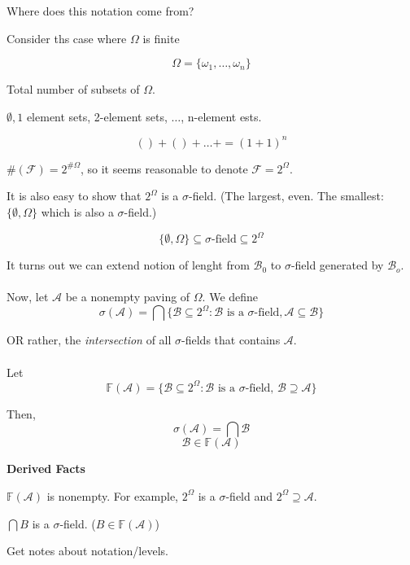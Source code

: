 \documentclass[11pt,fleqn]{book} %
\begin{document}
\begin{remark}
	Where does this notation come from?

Consider ths case where $\Omega$ is finite

$$\Omega = \{\omega_1, \dots, \omega_n \} $$

Total number of subsets of $\Omega$. 

$\emptyset, 1$ element sets, 2-element sets, $\dots$, n-element ests.

$$() + () + \dots + = (1+1)^n$$

$\#(\mathcal{F})  = 2^{\# \Omega}$, so it seems reasonable to denote $\mathcal{F} = 2^\Omega$. 

It is also easy to show that $2^\Omega$ is a $\sigma$-field. (The largest, even. The smallest: $\{\emptyset, \Omega\}$ which is also a $\sigma$-field.)

$$\{\emptyset, \Omega\} \subseteq \sigma\text{-field} \subseteq 2^\Omega$$ 
\end{remark}

It turns out we can extend notion of lenght from $\mathcal{B}_0$ to $\sigma$-field generated by $\mathcal{B}_o$. \\
\\
Now, let $\mathcal{A}$ be a nonempty paving of $\Omega$. We define 
$$\sigma(\mathcal{A}) = \bigcap \{\mathcal{B} \subseteq 2^\Omega: \mathcal{B}\text{ is a }\sigma\text{-field}, \mathcal{A} \subseteq \mathcal{B}\} $$

OR rather, the \textit{intersection} of all $\sigma$-fields that contains $\mathcal{A}$. \\
\\
Let 
$$\mathbb{F}(\mathcal{A}) = \{\mathcal{B} \subseteq 2^\Omega: \mathcal{B} \text{ is a } \sigma\text{-field, } \mathcal{B} \supseteq \mathcal{A} \}$$

Then, 
$$\sigma(\mathcal{A}) = \bigcap \mathcal{B}$$
$$\mathcal{B} \in \mathbb{F}(\mathcal{A}) $$

\textbf{Derived Facts}

$\mathbb{F}(\mathcal{A})$ is nonempty. For example, $2^\Omega$ is a $\sigma$-field and $2^\Omega \supseteq \mathcal{A}$. 

$\bigcap  B$ is a $\sigma$-field. ($B \in \mathbb{F}(\mathcal{A})$)

\begin{remark}
	Get notes about notation/levels.
\end{remark}
\end{document}
